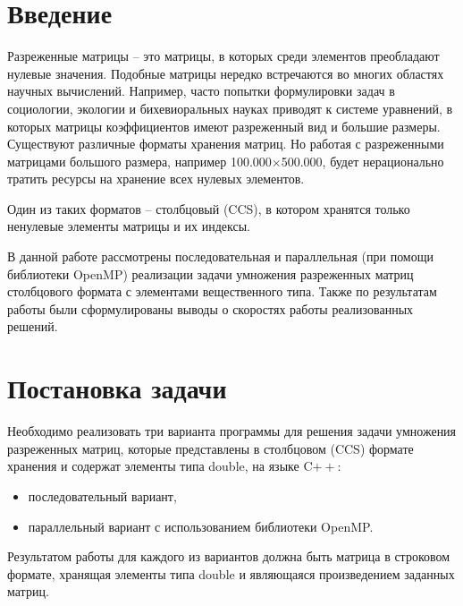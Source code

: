 \documentclass{report}
\begin{document}
\setcounter{page}{2}

\tableofcontents
\newpage

\section*{Введение}
\par Разреженные матрицы -- это матрицы, в которых среди элементов преобладают нулевые значения. Подобные матрицы нередко встречаются во многих областях научных вычислений. Например, часто попытки формулировки задач в социологии, экологии и бихевиоральных науках приводят к системе уравнений, в которых матрицы коэффициентов имеют разреженный вид и большие размеры.  Существуют различные форматы хранения матриц. Но работая с разреженными матрицами большого размера, например 100{.}000$\times$500{.}000, будет нерационально тратить ресурсы на хранение всех нулевых элементов.

\par Один из таких форматов -- столбцовый (CCS), в котором хранятся только ненулевые элементы матрицы и их индексы.

\par В данной работе рассмотрены последовательная и параллельная (при помощи библиотеки OpenMP) реализации задачи умножения разреженных матриц столбцового формата с элементами вещественного типа. Также по результатам работы были сформулированы выводы о скоростях работы реализованных решений.

\newpage

\section*{Постановка задачи}
\par Необходимо реализовать три варианта программы для решения задачи умножения разреженных матриц, которые представлены в столбцовом (CCS) формате хранения и содержат элементы типа double, на языке C$++$: 
    \begin{itemize}
    \item{последовательный вариант,}
    \item{параллельный вариант с использованием библиотеки OpenMP.}
    \end{itemize}
	
\par Результатом работы для каждого из вариантов должна быть матрица в строковом формате, хранящая элементы типа double и являющаяся произведением заданных матриц.
	
\end{document}
